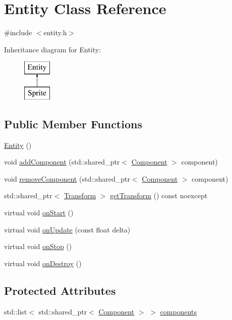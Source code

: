 \hypertarget{class_entity}{}\section{Entity Class Reference}
\label{class_entity}


{\ttfamily \#include $<$entity.\+h$>$}

Inheritance diagram for Entity\+:\begin{figure}[H]
\begin{center}
\leavevmode
\includegraphics[height=2.000000cm]{class_entity}
\end{center}
\end{figure}
\subsection*{Public Member Functions}
\begin{DoxyCompactItemize}
\item 
\hyperlink{class_entity_a980f368aa07ce358583982821533a54a}{Entity} ()
\item 
void \hyperlink{class_entity_a1e04612ca60083490443ff1dff92b3fe}{add\+Component} (std\+::shared\+\_\+ptr$<$ \hyperlink{class_component}{Component} $>$ component)
\item 
void \hyperlink{class_entity_a6c736e11abe151f3997be250e25935d6}{remove\+Component} (std\+::shared\+\_\+ptr$<$ \hyperlink{class_component}{Component} $>$ component)
\item 
std\+::shared\+\_\+ptr$<$ \hyperlink{class_transform}{Transform} $>$ \hyperlink{class_entity_a3fc75182569e1dafabffdb1920c16073}{get\+Transform} () const noexcept
\item 
virtual void \hyperlink{class_entity_afe788ab09347ad97ca39af8133a55589}{on\+Start} ()
\item 
virtual void \hyperlink{class_entity_a43745870ac080aea60c717611c10145d}{on\+Update} (const float delta)
\item 
virtual void \hyperlink{class_entity_ae791185bd4921dc4e8b7fed92f6553e6}{on\+Stop} ()
\item 
virtual void \hyperlink{class_entity_a6db576733100dea6173fa5818ff11f10}{on\+Destroy} ()
\end{DoxyCompactItemize}
\subsection*{Protected Attributes}
\begin{DoxyCompactItemize}
\item 
std\+::list$<$ std\+::shared\+\_\+ptr$<$ \hyperlink{class_component}{Component} $>$ $>$ \hyperlink{class_entity_a91f8301ced2daaaed904292bd34460dd}{components}
\end{DoxyCompactItemize}
